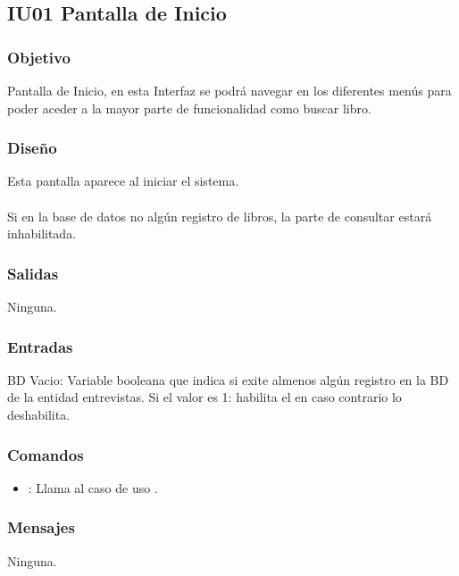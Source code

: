\newpage
\subsection{IU01 Pantalla de Inicio}

\subsubsection{Objetivo}
	Pantalla de Inicio, en esta Interfaz se podrá navegar en los diferentes menús para poder aceder a la mayor parte de funcionalidad como buscar libro.  

\subsubsection{Diseño}
	Esta pantalla aparece al iniciar el sistema.  \\\\
	Si en la base de datos no algún registro de libros, la parte de consultar estará inhabilitada. 


\subsubsection{Salidas}
	\begin{Citemize}
		\item Ninguna. 
	\end{Citemize}
	
\subsubsection{Entradas}
	\begin{Citemize}
		\item BD Vacio: Variable booleana que indica si exite almenos algún registro en la BD de la entidad entrevistas. Si el valor es 1: habilita el  en caso contrario lo deshabilita. 
	\end{Citemize}

\subsubsection{Comandos}
\begin{itemize}
	\item {}: Llama al caso de uso \UCref{5}.
\end{itemize}

\subsubsection{Mensajes}
	\begin{Citemize}
		\item Ninguna.
	\end{Citemize}